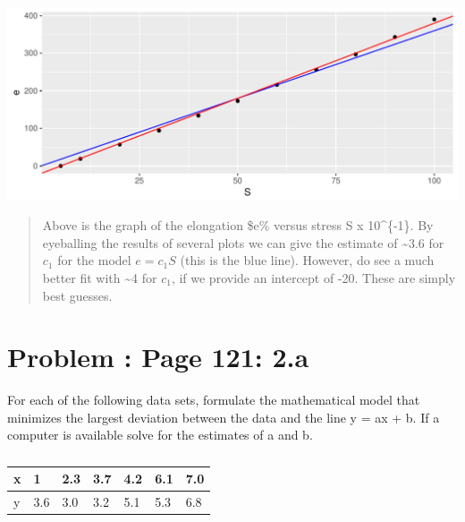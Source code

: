 \documentclass[]{article}
\begin{document}
\includegraphics{Homework_3_files/figure-latex/unnamed-chunk-1-1.pdf}

\begin{quote}
Above is the graph of the elongation \$e\% versus stress S x
10\^{}\{-1\}. By eyeballing the results of several plots we can give the
estimate of \textasciitilde{}3.6 for \(c_1\) for the model \(e = c_1S\)
(this is the blue line). However, do see a much better fit with
\textasciitilde{}4 for \(c_1\), if we provide an intercept of -20. These
are simply best guesses.
\end{quote}

\section{Problem : Page 121: 2.a}\label{problem-page-121-2.a}

For each of the following data sets, formulate the mathematical model
that minimizes the largest deviation between the data and the line y =
ax + b. If a computer is available solve for the estimates of a and b.

\begin{table}[!htbp]
\centering
\caption{}
\label{my-label}
\begin{tabular}{l|llllll}
x & 1   & 2.3 & 3.7 & 4.2 & 6.1 & 7.0 \\ \hline
y & 3.6 & 3.0 & 3.2 & 5.1 & 5.3 & 6.8  
\end{tabular}
\end{table}
\end{document}
